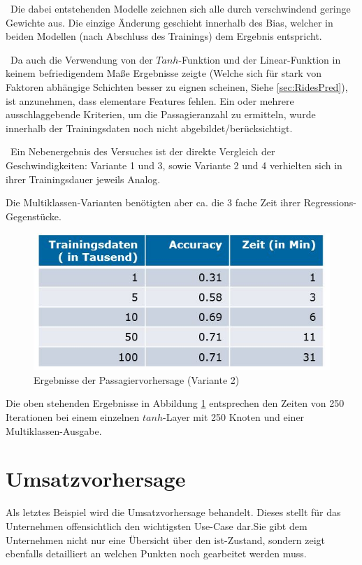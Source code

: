 ~\newline Die dabei entstehenden Modelle zeichnen sich alle durch verschwindend geringe Gewichte aus. Die einzige Änderung geschieht innerhalb des Bias, welcher in beiden Modellen (nach Abschluss des Trainings) dem Ergebnis entspricht.

~\newline Da auch die Verwendung von der $Tanh$-Funktion und der Linear-Funktion in keinem befriedigendem Maße Ergebnisse zeigte (Welche sich für stark von Faktoren abhängige Schichten besser zu eignen scheinen, Siehe \ref{sec:RidesPred}), ist anzunehmen, dass elementare Features fehlen. Ein oder mehrere ausschlaggebende Kriterien, um die Passagieranzahl zu ermitteln, wurde innerhalb der Trainingsdaten noch nicht abgebildet/berücksichtigt. 

~\newline Ein Nebenergebnis des Versuches ist der direkte Vergleich der Geschwindigkeiten: Variante 1 und 3, sowie Variante 2 und 4 verhielten sich in ihrer Trainingsdauer jeweils Analog. 

Die Multiklassen-Varianten benötigten aber ca. die 3 fache Zeit ihrer Regressions-Gegenstücke.

\begin{figure}[h]
	\begin{center}
		\includegraphics[width=0.8\linewidth]{Bilder/PassagierErgebnisse}
		\caption[Ergebnisse der Passagiervorhersage]{Ergebnisse der Passagiervorhersage (Variante 2)}
		\label{fig:PasErg}
	\end{center}
\end{figure}
 
 
 Die oben stehenden Ergebnisse in Abbildung \ref{fig:PasErg} entsprechen den Zeiten von 250 Iterationen bei einem einzelnen $tanh$-Layer mit 250 Knoten und einer Multiklassen-Ausgabe. 
\newpage
\section{Umsatzvorhersage}
\label{sec:RevPred}
Als letztes Beispiel wird die Umsatzvorhersage behandelt. Dieses stellt für das Unternehmen offensichtlich den wichtigsten Use-Case dar.Sie gibt dem Unternehmen nicht nur eine Übersicht über den ist-Zustand, sondern zeigt ebenfalls detailliert an welchen Punkten noch gearbeitet werden muss. 

